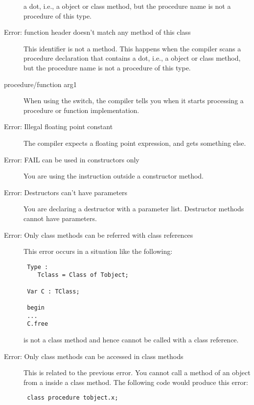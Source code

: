 \begin{description}
 a dot, i.e., a object or class method, but the procedure name is not a
 procedure of this type.
\item [Error: function header doesn't match any method of this class]
 This identifier is not a method.
 This happens when the compiler scans a procedure declaration that contains
 a dot, i.e., a object or class method, but the procedure name is not a
 procedure of this type.
\item [procedure/function arg1]
 When using the  switch, the compiler tells you when it starts
 processing a procedure or function implementation.
\item [Error: Illegal floating point constant]
 The compiler expects a floating point expression, and gets something else.
\item [Error: FAIL can be used in constructors only]
 You are using the  instruction outside a constructor method.
\item [Error: Destructors can't have parameters]
 You are declaring a destructor with a parameter list. Destructor methods
 cannot have parameters.
\item [Error: Only class methods can be referred with class references]
 This error occurs in a situation like the following:
 \begin{verbatim}
 Type :
    Tclass = Class of Tobject;

 Var C : TClass;

 begin
 ...
 C.free
 \end{verbatim}
  is not a class method and hence cannot be called with a class
 reference.
\item [Error: Only class methods can be accessed in class methods]
 This is related to the previous error. You cannot call a method of an object
 from a inside a class method. The following code would produce this error:
 \begin{verbatim}
 class procedure tobject.x;


\end{verbatim}
\end{description}
